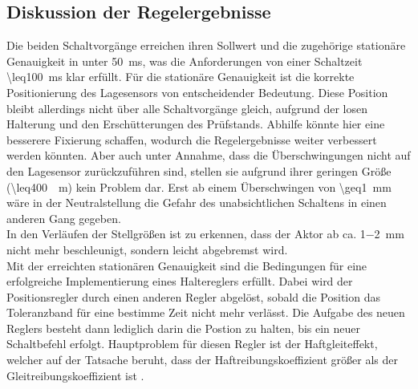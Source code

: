 \subsection{Diskussion der Regelergebnisse}\label{diskreg}
Die beiden Schaltvorgänge erreichen ihren Sollwert und die zugehörige stationäre Genauigkeit in unter \SI{50}{ms}, was die Anforderungen von einer Schaltzeit \SI{\leq100}{ms} klar erfüllt. Für die stationäre Genauigkeit ist die korrekte Positionierung des Lagesensors von entscheidender Bedeutung. Diese Position bleibt allerdings nicht über alle Schaltvorgänge gleich, aufgrund der losen Halterung und den Erschütterungen des Prüfstands. Abhilfe könnte hier eine besserere Fixierung schaffen, wodurch die Regelergebnisse weiter verbessert werden könnten. Aber auch unter Annahme, dass die Überschwingungen nicht auf den Lagesensor zurückzuführen sind, stellen sie aufgrund ihrer geringen Größe (\SI{\leq400}{\mu m}) kein Problem dar. Erst ab einem Überschwingen von \SI{\geq1}{mm} wäre in der Neutralstellung die Gefahr des unabsichtlichen Schaltens in einen anderen Gang gegeben.\\
In den Verläufen der Stellgrößen ist zu erkennen, dass der Aktor ab ca. \SI{1-2}{mm} nicht mehr beschleunigt, sondern leicht abgebremst wird.\\
Mit der erreichten stationären Genauigkeit sind die Bedingungen für eine erfolgreiche Implementierung eines Haltereglers erfüllt. Dabei wird der Positionsregler durch einen anderen Regler abgelöst, sobald die Position das Toleranzband für eine bestimme Zeit nicht mehr verlässt. Die Aufgabe des neuen Reglers besteht dann lediglich darin die Postion zu halten, bis ein neuer Schaltbefehl erfolgt. Hauptproblem für diesen Regler ist der Haftgleiteffekt, welcher auf der Tatsache beruht, dass der Haftreibungskoeffizient größer als der Gleitreibungskoeffizient ist \cite{Bowden2001}. 

